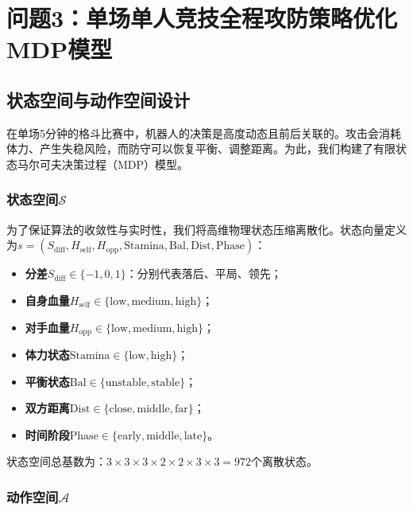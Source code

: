 \documentclass[a4paper,12pt]{article}
\numberwithin{equation}{section}
\numberwithin{table}{section}
\numberwithin{figure}{section}
\begin{document}
\section{问题3：单场单人竞技全程攻防策略优化MDP模型}

\subsection{状态空间与动作空间设计}

在单场5分钟的格斗比赛中，机器人的决策是高度动态且前后关联的。攻击会消耗体力、产生失稳风险，而防守可以恢复平衡、调整距离。为此，我们构建了有限状态马尔可夫决策过程（MDP）模型。

\subsubsection{状态空间$\mathcal{S}$}

为了保证算法的收敛性与实时性，我们将高维物理状态压缩离散化。状态向量定义为$s = (S_{\text{diff}}, H_{\text{self}}, H_{\text{opp}}, \text{Stamina}, \text{Bal}, \text{Dist}, \text{Phase})$：
\begin{itemize}
    \item \textbf{分差}$S_{\text{diff}} \in \{-1, 0, 1\}$：分别代表落后、平局、领先；
    \item \textbf{自身血量}$H_{\text{self}} \in \{\text{low}, \text{medium}, \text{high}\}$；
    \item \textbf{对手血量}$H_{\text{opp}} \in \{\text{low}, \text{medium}, \text{high}\}$；
    \item \textbf{体力状态}$\text{Stamina} \in \{\text{low}, \text{high}\}$；
    \item \textbf{平衡状态}$\text{Bal} \in \{\text{unstable}, \text{stable}\}$；
    \item \textbf{双方距离}$\text{Dist} \in \{\text{close}, \text{middle}, \text{far}\}$；
    \item \textbf{时间阶段}$\text{Phase} \in \{\text{early}, \text{middle}, \text{late}\}$。
\end{itemize}
状态空间总基数为：$3 \times 3 \times 3 \times 2 \times 2 \times 3 \times 3 = 972$个离散状态。

\subsubsection{动作空间$\mathcal{A}$}
\end{document}
